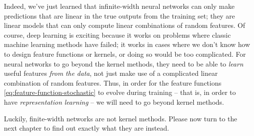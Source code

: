 Indeed, we've just learned that infinite-width neural networks can only make predictions that are linear in the true outputs from the training set; they are linear models that can only compute linear combinations of random features.
Of course, deep learning is exciting because it works on problems where classic machine learning methods have failed; it works in cases where we don't know how to design feature functions or kernels, or doing so would be too complicated. 
For neural networks to go beyond the kernel methods, they need to be able to \emph{learn} useful features \emph{from the data}, not just make use of a complicated linear combination of random features. 
Thus, in order for the feature functions \eqref{eq:feature-function-stochastic} to evolve during training 
-- that is, in order to have \emph{representation learning} -- we will need to go beyond kernel methods.



Luckily, finite-width networks are not kernel methods. Please now turn to the next chapter to find out exactly what they are instead.
























 











